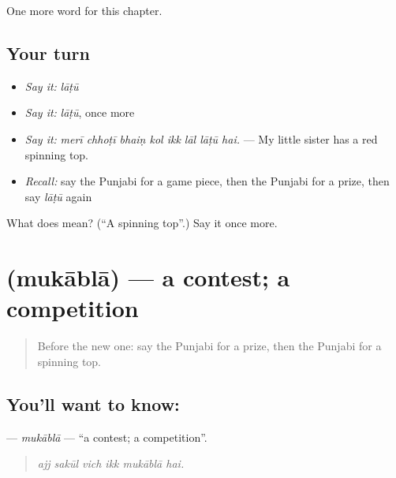 \begin{grammarlens}[title={What you've built}]
One more word for this chapter.
\end{grammarlens}

\subsection*{Your turn}
\begin{itemize}
\raggedright
  \item \emph{Say it:} \emph{lāṭū}
  \item \emph{Say it:} \emph{lāṭū}, once more
  \item \emph{Say it:} \emph{merī chhoṭī bhaiṇ kol ikk lāl lāṭū hai.} — My little sister has a red spinning top.
  \item \emph{Recall:} say the Punjabi for a game piece, then the Punjabi for a prize, then say \emph{lāṭū} again
\end{itemize}

\begin{tcolorbox}[breakable,colback=teal!4,colframe=teal!35!black,title={Before you move on}]
What does  mean? (\textquotedblleft{}A spinning top\textquotedblright{}.) Say it once more.
\end{tcolorbox}
\section[\texorpdfstring{\pa{ਮੁਕਾਬਲਾ} (mukāblā)}{ਮੁਕਾਬਲਾ (mukāblā)}]{ (mukāblā) — a contest; a competition}

\label{lesson:PA-C353-mukabla}



\begin{quote}
Before the new one: say the Punjabi for a prize, then the Punjabi for a spinning top.
\end{quote}

\subsection*{You'll want to know: }
\textbf{} — \emph{mukāblā} — \textquotedblleft{}a contest; a competition\textquotedblright{}.

\begin{quote}
     
\end{quote}

\begin{quote}
\emph{ajj sakūl vich ikk mukāblā hai.}
\end{quote}

